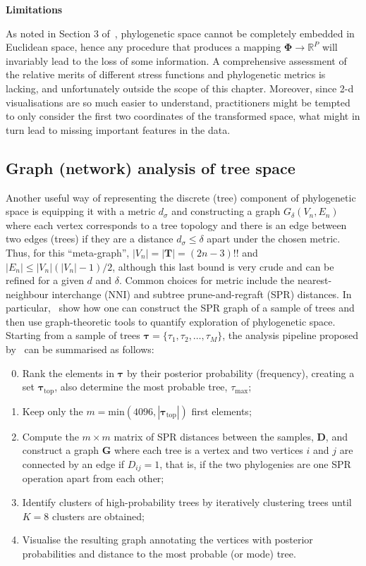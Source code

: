 \textbf{Limitations}

As noted in Section 3 of~\cite{Willis2017}, phylogenetic space cannot be completely embedded in Euclidean space, hence any procedure that produces a mapping $\boldsymbol\Phi \to \mathbb{R}^P$ will invariably lead to the loss of some information.
A comprehensive assessment of the relative merits of different stress functions and phylogenetic metrics is lacking, and unfortunately outside the scope of this chapter.
Moreover, since 2-d visualisations are so much easier to understand, practitioners might be tempted to only consider the first two coordinates of the transformed space, what might in turn lead to missing important features in the data.

\subsection{Graph (network) analysis of tree space}
\label{sec:graph}

Another useful way of representing the discrete (tree) component of phylogenetic space is equipping it with a metric $d_\sigma$ and constructing a graph $G_\delta(V_n, E_n)$ where each vertex corresponds to a tree topology and there is an edge between two edges (trees) if they are a distance $d_\sigma \leq \delta$ apart under the chosen metric.
Thus, for this ``meta-graph'', $|V_n| = |\boldsymbol T| = (2n-3)!!$ and $|E_n| \leq |V_n| (|V_n| - 1)/2$, although this last bound is very crude and can be refined for a given $d$ and $\delta$.
Common choices for metric include the nearest-neighbour interchange (NNI) and subtree prune-and-regraft (SPR) distances.
In particular,~\cite{Whidden2015} show how one can construct the SPR graph of a sample of trees and then use graph-theoretic tools to quantify exploration of phylogenetic space. 
Starting from a sample of trees $\boldsymbol \tau = \{\tau_1, \tau_2, \ldots, \tau_M\}$, the analysis pipeline proposed by~\cite{Whidden2015} can be summarised as follows:
\begin{enumerate}
 \setcounter{enumi}{-1} 
 \item Rank the elements in $\boldsymbol\tau$ by their posterior probability (frequency), creating a set $\boldsymbol \tau_{\text{top}}$, also determine the most probable tree, $\tau_{\text{max}}$;
 \item Keep only the $m = \text{min}(4096, |\boldsymbol\tau_{\text{top}}|)$ first elements;
 \item Compute the $m \times m$ matrix of SPR distances between the samples, $\boldsymbol D$, and construct a graph $\boldsymbol G$ where each tree is a vertex and two vertices $i$ and $j$ are connected by an edge if $D_{ij} = 1$, that is, if the two phylogenies are one SPR operation apart from each other;
 \item Identify clusters of high-probability trees by iteratively clustering trees until $K=8$ clusters are obtained;
 \item Visualise the resulting graph annotating the vertices with posterior probabilities and distance to the most probable (or mode) tree. 
\end{enumerate}

